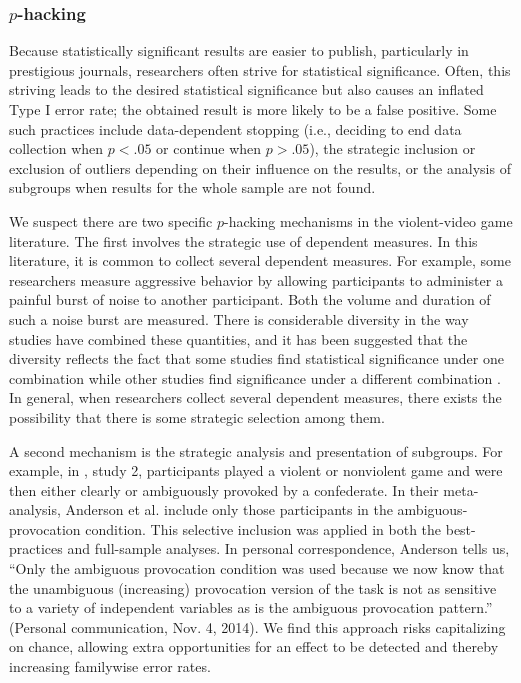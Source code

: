\documentclass[man]{apa6}
\begin{document}
\subsubsection{$p$-hacking}
Because statistically significant results are easier to publish, particularly in prestigious journals, researchers often strive for statistical significance. Often, this striving leads to the desired statistical significance but also causes an inflated Type I error rate; the obtained result is more likely to be a false positive. Some such practices include data-dependent stopping (i.e., deciding to end data collection when $p < .05$ or continue when $p > .05$), the strategic inclusion or exclusion of outliers depending on their influence on the results, or the analysis of subgroups when results for the whole sample are not found.

We suspect there are two specific $p$-hacking mechanisms in the violent-video game literature.  The first involves the strategic use of dependent measures.  In this literature, it is common to collect several dependent measures.  For example, some researchers measure aggressive behavior by allowing participants to administer a painful burst of noise to another participant. Both the volume and duration of such a noise burst are measured.  There is considerable diversity in the way studies have combined these quantities, and it has been suggested that the diversity reflects the fact that some studies find statistical significance under one combination while other studies find significance under a different combination \citep{Elson:etal:2014}.  In general, when researchers collect several dependent measures, there exists the possibility that there is some strategic selection among them.  

A second mechanism is the strategic analysis and presentation of subgroups. For example, in \citet{Anderson:etal:2004}, study 2, participants played a violent or nonviolent game and were then either clearly or ambiguously provoked by a confederate. In their meta-analysis, Anderson et al. include only those participants in the ambiguous-provocation condition. This selective inclusion was applied in both the best-practices and full-sample analyses. In personal correspondence, Anderson tells us, ``Only the ambiguous provocation condition was used because we now know that the unambiguous (increasing) provocation version of the task is not as sensitive to a variety of independent variables as is the ambiguous provocation pattern.'' (Personal communication, Nov. 4, 2014). 
We find this approach risks capitalizing on chance, allowing extra opportunities for an effect to be detected and thereby increasing familywise error rates.
\end{document}
